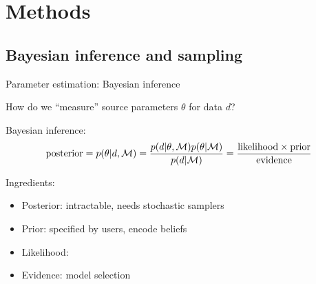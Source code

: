 \documentclass[usenames,dvipsnames,t]{beamer}
\begin{document}
\section{Methods}

\subsection{Bayesian inference and sampling}

\begin{frame}{Parameter estimation: Bayesian inference}

  \def\x{5mm}

  How do we ``measure'' source parameters $\theta$ for data $d$? 

  \vspace{\x}
  \pause
  
  Bayesian inference:
  \begin{equation*}
    {\rm{posterior}} = p(\theta|d, \mathcal{M}) = \frac{p(d|\theta, \mathcal{M}) p(\theta | \mathcal{M})}{p(d | \mathcal{M})} = \frac{\rm{likelihood} \times \rm{prior}}{\rm{evidence}}
  \end{equation*}

  \vspace{\x}
  \pause

  Ingredients:
  \begin{itemize}
    \item Posterior: intractable, needs stochastic samplers
    
    \item Prior: specified by users, encode beliefs
    
    \item Likelihood: 

    \item Evidence: model selection
  \end{itemize}
\end{frame}
\end{document}
